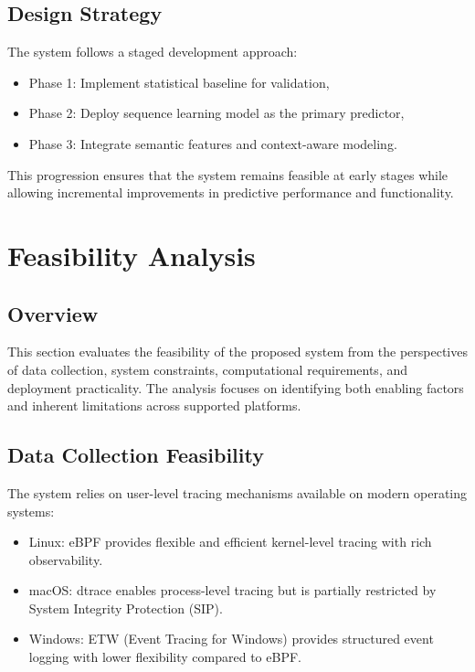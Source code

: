 \documentclass[11pt]{article}
\begin{document}
\subsection{Design Strategy}

The system follows a staged development approach:

\begin{itemize}
\item Phase 1: Implement statistical baseline for validation,
\item Phase 2: Deploy sequence learning model as the primary predictor,
\item Phase 3: Integrate semantic features and context-aware modeling.
\end{itemize}

This progression ensures that the system remains feasible at early stages while allowing incremental improvements in predictive performance and functionality.

\section{Feasibility Analysis}

\subsection{Overview}

This section evaluates the feasibility of the proposed system from the perspectives of data collection, system constraints, computational requirements, and deployment practicality. The analysis focuses on identifying both enabling factors and inherent limitations across supported platforms.

\subsection{Data Collection Feasibility}

The system relies on user-level tracing mechanisms available on modern operating systems:

\begin{itemize}
\item Linux: eBPF provides flexible and efficient kernel-level tracing with rich observability.
\item macOS: dtrace enables process-level tracing but is partially restricted by System Integrity Protection (SIP).
\item Windows: ETW (Event Tracing for Windows) provides structured event logging with lower flexibility compared to eBPF.
\end{itemize}
\end{document}
